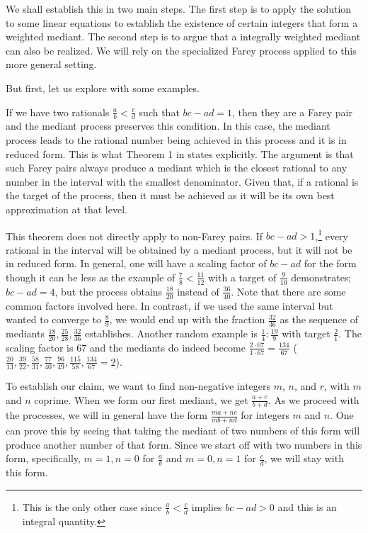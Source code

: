 \documentclass[12pt]{article}
\begin{document}
We shall establish this in two main steps. The first step is to apply the solution to some linear equations to establish the existence of certain integers that form a weighted mediant. The second step is to argue that a integrally weighted mediant can also be realized.  We will rely on the specialized Farey process applied to this more general setting. 

But first, let us explore with some examples. 

If we have two rationals $\frac{a}{b} < \frac{c}{d}$ such that $bc - ad = 1$, then they are a Farey pair and the mediant process preserves this condition. In this case, the mediant process leads to the rational number being achieved in this process and it is in reduced form. This is what Theorem 1 in \cite{richards} states explicitly. The argument is that such Farey pairs always produce a mediant which is the closest rational to any number in the interval with the smallest denominator. Given that, if a rational is the target of the process, then it must be achieved as it will be its own best approximation at that level. 

This theorem does not directly apply to non-Farey pairs. If $bc-ad > 1$,\footnote{This is the only other case since $\frac{a}{b} < \frac{c}{d}$ implies $bc - ad > 0$ and this is an integral quantity.} every rational in the interval will be obtained by a mediant process, but it will not be in reduced form. In general, one will have a scaling factor of $bc-ad$ for the form though it can be less as the example of $\frac{7}{8}< \frac{11}{12}$ with a target of $\frac{9}{10}$ demonstrates; $bc-ad = 4$, but the process obtains $\frac{18}{20}$ instead of $\frac{36}{40}$. Note that there are some common factors involved here. In contrast, if we used the same interval but wanted to converge to $\frac{8}{9}$, we would end up with the fraction $\frac{32}{36}$ as the sequence of mediants $\frac{18}{20}, \frac{25}{28}, \frac{32}{36}$ establishes. Another random example is  $\frac{1}{4} : \frac{19}{9}$ with target $\frac{2}{1}$. The scaling factor is $67$ and the mediants do indeed become $\frac{2 \cdot 67}{1 \cdot 67} = \frac{134}{67}$  ($\frac{20}{13}, \frac{39}{22}, \frac{58}{31}, \frac{77}{40}, \frac{96}{49}, \frac{115}{58}, \frac{134}{67} = 2$). 


To establish our claim, we want to find non-negative integers $m$, $n$, and $r$, with $m$ and $n$ coprime. When we form our first mediant, we get $\frac{a+c}{b+d}$. As we proceed with the processes, we will in general have the form $\frac{ma + nc}{mb + nd}$ for integers $m$ and $n$. One can prove this by seeing that taking the mediant of two numbers of this form will produce another number of that form. Since we start off with two numbers in this form, specifically, $m=1, n=0$ for $\frac{a}{b}$ and $m=0, n=1$ for $\frac{c}{d}$, we will stay with this form. 
\end{document}
